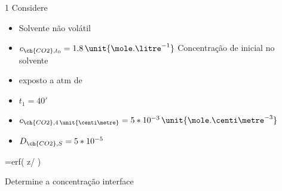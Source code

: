 \documentclass[\mainfilename]{subfiles}
\begin{document}

\begin{questionBox}1{ %
    Considere
} %
    \begin{itemize}
        \item Solvente não volátil
        \item \(c_{\ch{CO2},t_0}=1.8\,\unit{\mole.\litre^{-1}}\) Concentração de  inicial no solvente
        \item exposto a atm de 
        \item \(t_1=40'\)
        \item \(c_{\ch{CO2},4\,\unit{\centi\metre}}=5*10^{-3}\,\unit{\mole.\centi\metre^{-3}}\)
        \item \(D_{\ch{CO2},S}=5*10^{-5}\)
    \end{itemize}

    \begin{BM}
        =erf\left(
            z/
        \right)
    \end{BM}

    

    Determine a concentração interface
\end{questionBox}
\end{document}
